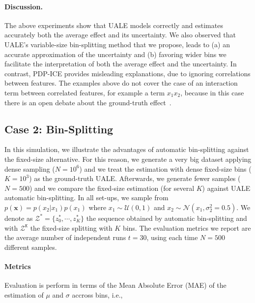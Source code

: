\documentclass[twoside]{article}
\begin{document}
\paragraph{Discussion.}

The above experiments show that UALE models correctly and estimates
accurately both the average effect and its uncertainty. We also
observed that UALE's variable-size bin-splitting method that we
propose, leads to (a) an accurate approximation of the uncertainty and
(b) favoring wider bins we facilitate the interpretation of both the
average effect and the uncertainty. In contrast, PDP-ICE provides
misleading explanations, due to ignoring correlations between
features. The examples above do not cover the case of an interaction
term between correlated features, for example a term \(x_1x_2\),
because in this case there is an open debate about the ground-truth
effect~\citep{Gromping2020MAEP}.

\subsection{Case 2: Bin-Splitting}
\label{sec:simulation-examples-2}

In this simulation, we illustrate the advantages of automatic
bin-splitting against the fixed-size alternative. For this reason, we
generate a very big dataset applying dense sampling (\(N=10^6\)) and
we treat the estimation with dense fixed-size bins (\(K=10^3\)) as the
ground-truth UALE. Afterwards, we generate fewer samples (\(N=500\))
and we compare the fixed-size estimation (for several \(K\)) against
UALE automatic bin-splitting. In all set-ups, we sample from
\(p(\mathbf{x}) = p(x_2|x_1)p(x_1)\) where
\(x_1 \sim \mathcal{U}(0,1)\) and
\(x_2 \sim \mathcal{N}(x_1, \sigma_2^2=0.5)\). We denote as
\(\mathcal{Z^*} = \{z^*_0, \cdots,
z^*_K\}\) the sequence obtained by automatic
bin-splitting and with \(\mathcal{Z^{\mathtt{K}}}\) the fixed-size
splitting with \(K\) bins. The evaluation metrics we report are the
average number of independent runs \(t = 30\), using each time
\(N=500\) different samples.

\paragraph{Metrics}

Evaluation is perform in terms of the Mean Absolute Error (MAE) of the
estimation of \(\mu\) and \(\sigma\) accross bins, i.e.,

\end{document}
